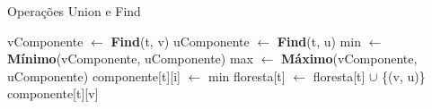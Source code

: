 \documentclass[12pt]{article}
\begin{document}
\begin{algorithm}[H]
    \DontPrintSemicolon
    \caption{Operações Union e Find}
    \label{alg_par2}
    {
        vComponente $\gets$ \textbf{Find}(t, v)\;
        uComponente $\gets$ \textbf{Find}(t, u)\;
        min $\gets$ \textbf{Mínimo}(vComponente, uComponente)\;
		max $\gets$ \textbf{Máximo}(vComponente, uComponente)\;
        {
            {
                {
                    componente[t][i] $\gets$ min\;
                }
            }
            floresta[t] $\gets$ floresta[t] $\cup$ \{(v, u)\}\;
        }
    }
    {
        \Return componente[t][v]\;
    }
\end{algorithm}
\end{document}
